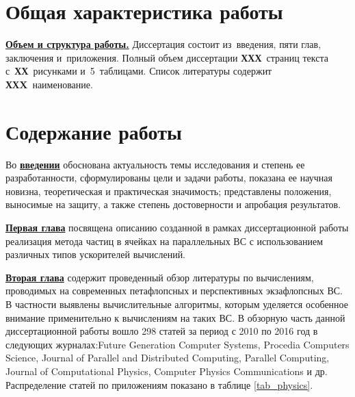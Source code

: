 
\section*{Общая характеристика работы}

\newcommand{\actuality}{\underline{\textbf{\actualityTXT}}}
\newcommand{\progress}{\underline{\textbf{\progressTXT}}}
\newcommand{\aim}{\underline{{\textbf\aimTXT}}}
\newcommand{\tasks}{\underline{\textbf{\tasksTXT}}}
\newcommand{\novelty}{\underline{\textbf{\noveltyTXT}}}
\newcommand{\influence}{\underline{\textbf{\influenceTXT}}}
\newcommand{\methods}{\underline{\textbf{\methodsTXT}}}
\newcommand{\defpositions}{\underline{\textbf{\defpositionsTXT}}}
\newcommand{\reliability}{\underline{\textbf{\reliabilityTXT}}}
\newcommand{\probation}{\underline{\textbf{\probationTXT}}}
\newcommand{\contribution}{\underline{\textbf{\contributionTXT}}}
\newcommand{\publications}{\underline{\textbf{\publicationsTXT}}}



\underline{\textbf{Объем и структура работы.}} Диссертация состоит из~введения,
пяти глав, заключения и~приложения. Полный объем диссертации
\textbf{ХХХ}~страниц текста с~\textbf{ХХ}~рисунками и~5~таблицами. Список литературы содержит \textbf{ХХX}~наименование.

\section*{Содержание работы}
Во \underline{\textbf{введении}} 
обоснована актуальность темы исследования и степень
ее разработанности, сформулированы цели и задачи работы, показана ее научная новизна, теоретическая и практическая значимость; представлены положения, выносимые на защиту, а также степень достоверности и апробация результатов.






\underline{\textbf{Первая глава}} посвящена описанию созданной в рамках диссертационной работы реализация метода частиц в ячейках на параллельных ВС с использованием различных типов ускорителей вычислений. 

\underline{\textbf{Вторая глава}} содержит проведенный обзор литературы по вычислениям, проводимых на современных петафлопсных и перспективных экзафлопсных ВС. В частности выявлены вычислительные алгоритмы, которым уделяется особенное внимание применительно к вычислениям на таких ВС.
В обзорную часть данной диссертационной работы вошло 298 статей за период с 2010 по 2016 год в следующих журналах:Future Generation Computer Systems, Procedia Computers Science, Journal of Parallel and Distributed Computing, Parallel Computing, Journal of Computational Physics, Computer Physics Communications и др.  Распределение статей по приложениям показано в таблице \ref{tab_physics}.

